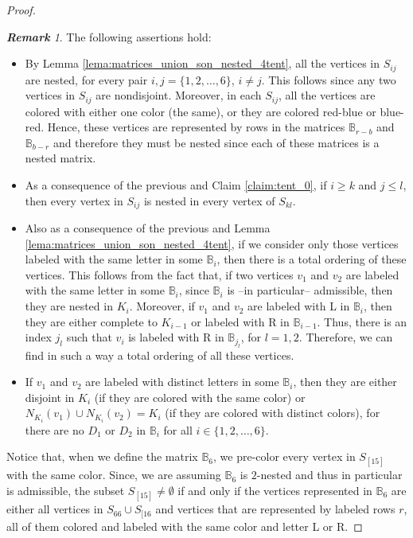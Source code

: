 \documentclass[12pt]{book}
\theoremstyle{plain}
\theoremstyle{remark}
\newtheorem{remark}[teo]{\textbf{\textit{Remark}}}
\begin{document}
\begin{proof}
\begin{remark} The following assertions hold:
	\begin{itemize}
		\item By Lemma \ref{lema:matrices_union_son_nested_4tent}, all the vertices in $S_{ij}$ are nested, for every pair $i, j = \{1, 2, \ldots, 6\}$, $i \neq j$. This follows since any two vertices in $S_{ij}$ are nondisjoint. Moreover, in each $S_{ij}$, all the vertices are colored with either one color (the same), or they are colored red-blue or blue-red. Hence, these vertices are represented by rows in the matrices $\mathbb B_{r-b}$ and $\mathbb B_{b-r}$ and therefore they must be nested since each of these matrices is a nested matrix.
		\item As a consequence of the previous and Claim \ref{claim:tent_0}, if $i \geq k$ and $j\leq l$, then every vertex in $S_{ij}$ is nested in every vertex of $S_{kl}$.
		\item Also as a consequence of the previous and Lemma \ref{lema:matrices_union_son_nested_4tent}, if we consider only those vertices labeled with the same letter in some $\mathbb B_i$, then there is a total ordering of these vertices. This follows from the fact that, if two vertices $v_1$ and $v_2$ are labeled with the same letter in some $\mathbb B_i$, since $\mathbb B_i$ is --in particular-- admissible, then they are nested in $K_i$. Moreover, if $v_1$ and $v_2$ are labeled with L in $\mathbb B_i$, then they are either complete to $K_{i-1}$ or labeled with R in $\mathbb B_{i-1}$. Thus, there is an index $j_l$ such that $v_i$ is labeled with R  in $\mathbb B_{j_l}$, for $l=1,2$. Therefore, we can find in such a way a total ordering of all these vertices.
		\item If $v_1$ and $v_2$ are labeled with distinct letters in some $\mathbb B_i$, then they are either disjoint in $K_i$ (if they are colored with the same color) or $N_{K_i}(v_1) \cup N_{K_i}(v_2) = K_i$  (if they are colored with distinct colors), for there are no $D_1$ or $D_2$ in $\mathbb B_i$ for all $i \in \{1, 2, \ldots, 6\}$.
	\end{itemize}
\end{remark}


Notice that, when we define the matrix $\mathbb B_6$, we pre-color every vertex in $S_{[15]}$ with the same color. Since, we are assuming $\mathbb B_6$ is $2$-nested and thus in particular is admissible, the subset $S_{[15]} \neq \emptyset$ if and only if the vertices represented in $\mathbb B_6$ are either all vertices in $S_{66} \cup S_{[16}$ and vertices that are represented by labeled rows $r$, all of them colored and labeled with the same color and letter L or R.


\end{proof}
\end{document}
